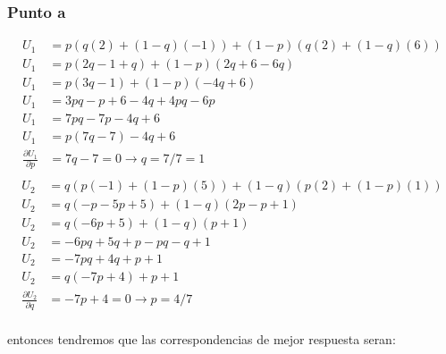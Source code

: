 \documentclass[11pt]{article}
\begin{document}
\subsubsection{Punto a}
\begin{flushleft}
    \begin{align*}
        U_1 &= p(q(2)+(1-q)(-1))+(1-p)(q(2)+(1-q)(6))\\
        U_1 &= p(2q-1+q)+(1-p)(2q+6-6q)\\
        U_1 &= p(3q-1)+(1-p)(-4q+6)\\
        U_1 &= 3pq-p+6-4q+4pq-6p\\
        U_1 &= 7pq-7p-4q+6\\
        U_1 &= p(7q-7)-4q+6\\
        \frac{\partial U_1}{\partial p} &= 7q-7=0\to q=7/7=1\\
    \end{align*}
    \begin{align*}
        U_2 &= q(p(-1)+(1-p)(5))+(1-q)(p(2)+(1-p)(1))\\
        U_2 &= q(-p-5p+5)+(1-q)(2p-p+1)\\
        U_2 &= q(-6p+5)+(1-q)(p+1)\\
        U_2 &= -6pq+5q+p-pq-q+1\\
        U_2 &= -7pq+4q+p+1\\
        U_2 &= q(-7p+4)+p+1\\
        \frac{\partial U_2}{\partial q} &= -7p+4=0\to p=4/7\\
    \end{align*}

    entonces tendremos que las correspondencias de mejor respuesta seran:\\~\\


\end{flushleft}
\end{document}
